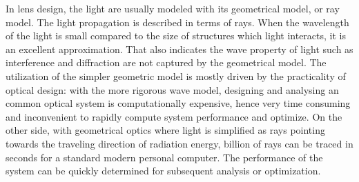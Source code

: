 In lens design, the light are usually modeled with its geometrical model, or ray model. The light propagation is described in terms of rays. When the wavelength of the light is small compared to the size of structures which light interacts, it is an excellent approximation. That also indicates the wave property of light such as interference and diffraction are not captured by the geometrical model. The utilization of the simpler geometric model is mostly driven by the practicality of optical design: with the more rigorous wave model, designing and analysing an common optical system is computationally expensive, hence very time consuming and inconvenient to rapidly compute system performance and optimize. On the other side, with geometrical optics where light is simplified as rays pointing towards the traveling direction of radiation energy, billion of rays can be traced in seconds for a standard modern personal computer. The performance of the system can be quickly determined for subsequent analysis or optimization.   



